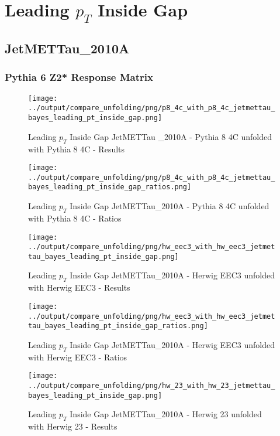 \documentclass[11pt]{book}
\begin{document}
\newpage
\chapter{Leading $p_{T}$ Inside Gap}
\section{JetMETTau\_2010A}
\subsection{Pythia 6 Z2* Response Matrix}


\begin{figure}[ht]
\centering
\texttt{[image: ../output/compare\_unfolding/png/p8\_4c\_with\_p8\_4c\_jetmettau\_bayes\_leading\_pt\_inside\_gap.png]}
\caption{Leading $p_{T}$ Inside Gap JetMETTau \_2010A - Pythia 8 4C unfolded with Pythia 8 4C - Results}
\label{p8_p8_jetmettau_bayes_leading_pt_inside_gap_a}
\end{figure}

\begin{figure}[ht]
\centering
\texttt{[image: ../output/compare\_unfolding/png/p8\_4c\_with\_p8\_4c\_jetmettau\_bayes\_leading\_pt\_inside\_gap\_ratios.png]}
\caption{Leading $p_{T}$ Inside Gap JetMETTau\_2010A - Pythia 8 4C unfolded with Pythia 8 4C - Ratios}
\label{p8_p8_jetmettau_bayes_leading_pt_inside_gap_b}
\end{figure}

\begin{figure}[ht]
\centering
\texttt{[image: ../output/compare\_unfolding/png/hw\_eec3\_with\_hw\_eec3\_jetmettau\_bayes\_leading\_pt\_inside\_gap.png]}
\caption{Leading $p_{T}$ Inside Gap JetMETTau\_2010A - Herwig EEC3 unfolded with Herwig EEC3 - Results}
\label{hw_eec3_hw_eec3_jetmettau_bayes_leading_pt_inside_gap_a}
\end{figure}

\begin{figure}[ht]
\centering
\texttt{[image: ../output/compare\_unfolding/png/hw\_eec3\_with\_hw\_eec3\_jetmettau\_bayes\_leading\_pt\_inside\_gap\_ratios.png]}
\caption{Leading $p_{T}$ Inside Gap JetMETTau\_2010A - Herwig EEC3 unfolded with Herwig EEC3 - Ratios}
\label{hw_eec3_hw_eec3_jetmettau_bayes_leading_pt_inside_gap_b}
\end{figure}

\begin{figure}[ht]
\centering
\texttt{[image: ../output/compare\_unfolding/png/hw\_23\_with\_hw\_23\_jetmettau\_bayes\_leading\_pt\_inside\_gap.png]}
\caption{Leading $p_{T}$ Inside Gap JetMETTau\_2010A - Herwig 23 unfolded with Herwig 23 - Results}
\label{hw_23_hw_23_jetmettau_bayes_leading_pt_inside_gap_a}
\end{figure}
\end{document}
